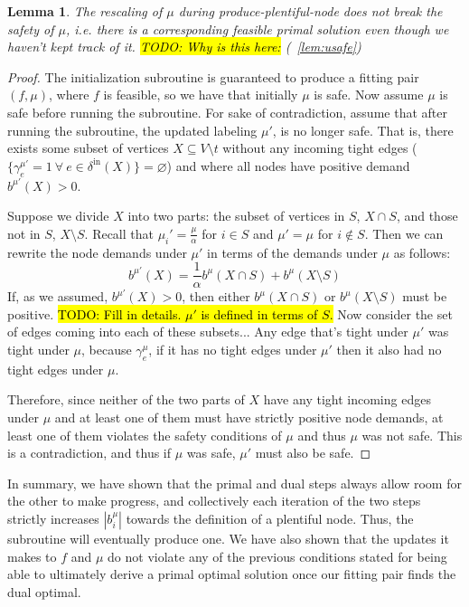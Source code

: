 \documentclass[11pt]{article}
\newtheorem{lemma}[theorem]{Lemma}
\theoremstyle{definition}
\theoremstyle{definition}
\newcommand{\biu}{b_{i}^{\mu}}
\newcommand{\geu}{\gamma_e^{\mu}}
\newcommand{\vnott}{V \setminus t}
\newcommand{\din}{\delta^{\text{in}}}
\newcommand{\fp}{(f,\mu)}
\newcommand{\todo}[1]{\hl{TODO: #1}}
\begin{document}
    \begin{lemma}
        The rescaling of $\mu$ during produce-plentiful-node does not break 
        the safety of $\mu$, i.e. there is a corresponding feasible primal
        solution even though we haven't kept track of it.
        \todo{Why is this here:} (~\ref{lem:usafe})
    \end{lemma}
    \begin{proof}
    The initialization subroutine is guaranteed to produce a fitting pair $\fp$,
    where $f$ is feasible, so we have that initially $\mu$ is safe. Now assume $\mu$
    is safe before running the subroutine. For sake of contradiction, assume that
    after running the subroutine, the updated labeling $\mu'$,
    is no longer safe. That is, there exists some subset of vertices $X \subseteq \vnott$  
    without any incoming tight edges ($\{\gamma_e^{\mu'} = 1\ \forall\ e \in \din(X)\} = \varnothing$)
    and where all nodes have positive demand $b^{\mu'}(X) > 0$.

    Suppose we divide $X$ into two parts: the subset of vertices in $S$, $X \cap S$, and those
    not in $S$, $X \setminus S$. Recall that $\mu_i' = \frac{\mu}{\alpha}$ for $i\in S$
    and $\mu' = \mu$ for $i \notin S$. Then we can rewrite the node demands under $\mu'$
    in terms of the demands under $\mu$ as follows:
    $$b^{\mu'}(X) = \frac{1}{\alpha}b^{\mu}(X \cap S) + b^{\mu}(X \setminus S)$$
    If, as we assumed, $b^{\mu'}(X) > 0$, then either $b^{\mu}(X \cap S)$ or 
    $b^{\mu}(X \setminus S)$ must be positive.
    \todo{Fill in details. $\mu'$ is defined in terms of $S$.}
    Now consider the set of edges coming into each of these subsets...
    Any edge that's tight under $\mu'$ was tight under $\mu$, because $\geu$, if
    it has no tight edges under $\mu'$ then it also had no tight edges under
    $\mu$.

    Therefore, since neither of the two parts of $X$
    have any tight incoming edges under $\mu$ and at least one of them
    must have strictly positive node demands, at least one of them
    violates the safety conditions of $\mu$ and thus $\mu$ was not safe.
    This is a contradiction, and thus if $\mu$ was safe, $\mu'$ must also be safe.

    \end{proof}

    In summary, we have shown that the primal and dual steps always allow room for the other to make progress, and collectively each iteration of the two steps strictly increases $|\biu|$ towards
    the definition of a plentiful node. Thus, the subroutine will eventually produce one. We have also shown that the updates it makes to $f$ and $\mu$ do not violate any of the previous conditions stated for being able to ultimately derive a primal optimal solution once our fitting pair finds the dual optimal. 
\end{document}
